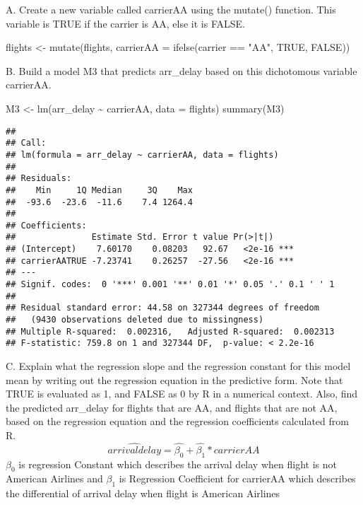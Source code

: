 \documentclass[
]{article}
\newenvironment{Shaded}{\begin{snugshade}}{\end{snugshade}}
\newcommand{\AttributeTok}[1]{\textcolor[rgb]{0.77,0.63,0.00}{#1}}
\newcommand{\ConstantTok}[1]{\textcolor[rgb]{0.00,0.00,0.00}{#1}}
\newcommand{\FunctionTok}[1]{\textcolor[rgb]{0.00,0.00,0.00}{#1}}
\newcommand{\NormalTok}[1]{#1}
\newcommand{\OtherTok}[1]{\textcolor[rgb]{0.56,0.35,0.01}{#1}}
\newcommand{\SpecialCharTok}[1]{\textcolor[rgb]{0.00,0.00,0.00}{#1}}
\newcommand{\StringTok}[1]{\textcolor[rgb]{0.31,0.60,0.02}{#1}}
\begin{document}
A. Create a new variable called carrierAA using the mutate() function.
This variable is TRUE if the carrier is AA, else it is FALSE.

\begin{Shaded}
\begin{Highlighting}[]
\NormalTok{flights }\OtherTok{\textless{}{-}} \FunctionTok{mutate}\NormalTok{(flights, }\AttributeTok{carrierAA =} \FunctionTok{ifelse}\NormalTok{(carrier }\SpecialCharTok{==} \StringTok{"AA"}\NormalTok{,}
    \ConstantTok{TRUE}\NormalTok{, }\ConstantTok{FALSE}\NormalTok{))}
\end{Highlighting}
\end{Shaded}

B. Build a model M3 that predicts arr\_delay based on this dichotomous
variable carrierAA.

\begin{Shaded}
\begin{Highlighting}[]
\NormalTok{M3 }\OtherTok{\textless{}{-}} \FunctionTok{lm}\NormalTok{(arr\_delay }\SpecialCharTok{\textasciitilde{}}\NormalTok{ carrierAA, }\AttributeTok{data =}\NormalTok{ flights)}
\FunctionTok{summary}\NormalTok{(M3)}
\end{Highlighting}
\end{Shaded}

\begin{verbatim}
## 
## Call:
## lm(formula = arr_delay ~ carrierAA, data = flights)
## 
## Residuals:
##    Min     1Q Median     3Q    Max 
##  -93.6  -23.6  -11.6    7.4 1264.4 
## 
## Coefficients:
##               Estimate Std. Error t value Pr(>|t|)    
## (Intercept)    7.60170    0.08203   92.67   <2e-16 ***
## carrierAATRUE -7.23741    0.26257  -27.56   <2e-16 ***
## ---
## Signif. codes:  0 '***' 0.001 '**' 0.01 '*' 0.05 '.' 0.1 ' ' 1
## 
## Residual standard error: 44.58 on 327344 degrees of freedom
##   (9430 observations deleted due to missingness)
## Multiple R-squared:  0.002316,   Adjusted R-squared:  0.002313 
## F-statistic: 759.8 on 1 and 327344 DF,  p-value: < 2.2e-16
\end{verbatim}

C. Explain what the regression slope and the regression constant for
this model mean by writing out the regression equation in the predictive
form. Note that TRUE is evaluated as 1, and FALSE as 0 by R in a
numerical context. Also, find the predicted arr\_delay for flights that
are AA, and flights that are not AA, based on the regression equation
and the regression coefficients calculated from R. \[
\hat{arrivaldelay} = \hat{\beta_{0}} + \hat{\beta_{1}} * carrierAA
\] \(\beta_{0}\) is regression Constant which describes the arrival
delay when flight is not American Airlines and \(\beta_{1}\) is
Regression Coefficient for carrierAA which describes the differential of
arrival delay when flight is American Airlines
\end{document}
